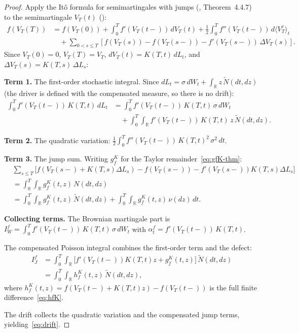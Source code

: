 \documentclass[11pt,a4paper]{article}
\theoremstyle{plain}
\theoremstyle{definition}
\theoremstyle{remark}
\newcommand{\R}{\mathbb{R}}
\newcommand{\Ntilde}{\widetilde{N}}
\begin{document}
\begin{proof}
Apply the It\^o formula for semimartingales with jumps
(\cite{Applebaum2009}, Theorem~4.4.7) to the
semimartingale $V_T(t)$
():
\begin{align*}
  f(V_T(T)) &= f(V_T(0))
  + \int_0^T f'(V_T(t\!-\!))\,dV_T(t)
  + \tfrac{1}{2}\int_0^T f''(V_T(t\!-\!))\,d\langle V_T^c\rangle_t\\
  &\quad+ \sum_{0 < s \leq T}\left[f(V_T(s)) - f(V_T(s\!-\!))
  - f'(V_T(s\!-\!))\,\Delta V_T(s)\right].
\end{align*}
Since $V_T(0) = 0$, $V_T(T) = V_T$,
$dV_T(t) = K(T,t)\,dL_t$, and
$\Delta V_T(s) = K(T,s)\,\Delta L_s$:

\textbf{Term 1.} The first-order stochastic integral.
Since $dL_t = \sigma\,dW_t + \int_\R z\,\Ntilde(dt,dz)$
(the driver is defined with the compensated measure, so
there is no drift):
\begin{align*}
  \int_0^T f'(V_T(t\!-\!))\,K(T,t)\,dL_t
  &= \int_0^T f'(V_T(t\!-\!))\,K(T,t)\,\sigma\,dW_t\\
  &\quad+ \int_0^T\!\!\int_\R f'(V_T(t\!-\!))\,K(T,t)\,z\,
  \Ntilde(dt,dz).
\end{align*}

\textbf{Term 2.} The quadratic variation:
$\frac{1}{2}\int_0^T f''(V_T(t\!-\!))\,K(T,t)^2\,\sigma^2\,dt$.

\textbf{Term 3.} The jump sum.  Writing
$g_f^K$ for the Taylor remainder~\eqref{eq:gfK-thm}:
\begin{align*}
  &\sum_{s \leq T}\bigl[f(V_T(s\!-\!) + K(T,s)\Delta L_s)
  - f(V_T(s\!-\!)) - f'(V_T(s\!-\!))K(T,s)\Delta L_s\bigr]\\
  &= \int_0^T\!\!\int_\R g_f^K(t,z)\,N(dt,dz)\\
  &= \int_0^T\!\!\int_\R g_f^K(t,z)\,\Ntilde(dt,dz)
  + \int_0^T\!\!\int_\R g_f^K(t,z)\,\nu(dz)\,dt.
\end{align*}

\textbf{Collecting terms.}  The Brownian martingale part is
$I_W^f = \int_0^T f'(V_T(t\!-\!))\,K(T,t)\,\sigma\,dW_t$
with $\alpha_t^f = f'(V_T(t\!-\!))\,K(T,t)$.

The compensated Poisson integral combines the first-order term
and the defect:
\begin{align*}
  I_J^f &= \int_0^T\!\!\int_\R
  \bigl[f'(V_T(t\!-\!))K(T,t)z + g_f^K(t,z)\bigr]\,
  \Ntilde(dt,dz)\\
  &= \int_0^T\!\!\int_\R h_f^K(t,z)\,\Ntilde(dt,dz),
\end{align*}
where $h_f^K(t,z) = f(V_T(t\!-\!) + K(T,t)z) - f(V_T(t\!-\!))$
is the full finite difference~\eqref{eq:hfK}.

The drift collects the quadratic variation and the compensated
jump terms, yielding~\eqref{eq:drift}.
\end{proof}
\end{document}
